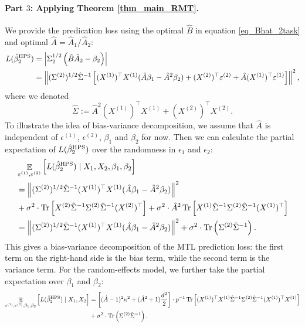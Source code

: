 \paragraph{Part $3$: Applying Theorem \ref{thm_main_RMT}.}
We provide the predication loss using the optimal $\hat B$ in equation \eqref{eq_Bhat_2task} and optimal $\hat A=\hat A_1/\hat A_2$:
\begin{align}
L(\hat{\beta}_2^{\textup{HPS}}) &=\left|\Sigma_2^{1/2} \left( \hat B \hat A_2 - \beta_2\right)\right| \nonumber\\
&=  \left\| (\Sigma^{(2)})^{1/2}\hat \Sigma^{-1} \left[(X^{(1)})^\top X^{(1)} (\hat A\beta_1-\hat A^2\beta_2)+ (X^{(2)})^\top \varepsilon^{(2)} + \hat A   (X^{(1)})^\top \varepsilon^{(1)} \right]\right\|^2,\label{Lbeta_HPS}
\end{align}
where we denoted
$$\hat \Sigma:= \hat A^2 (X^{(1)})^\top X^{(1)}  + (X^{(2)})^\top X^{(2)} .$$
To illustrate the idea of bias-variance decomposition, we assume that $\hat A$ is independent of $\epsilon^{(1)}$, $\epsilon^{(2)}$, $\beta_1$ and $\beta_2$ for now. Then we can calculate the partial expectation of $L(\hat{\beta}_2^{\textup{HPS}})$ over the randomness in $\epsilon_1$ and $\epsilon_2$:
 \begin{align}
	&\exarg{\epsilon^{(1)}, \epsilon^{(2)}}{L(\hat{\beta}_2^{\MTL}) \mid X_1, X_2,\beta_1,\beta_2} \nonumber \\
&	=  \bignorm{(\Sigma^{(2)})^{1/2}\hat\Sigma^{-1} (X^{(1)})^{\top}X^{(1)} (\hat A \beta_1 - \hat A^2\beta_2)}^2 \nonumber\\ %
			& + \sigma^2\cdot \bigtr{ X^{(2)} \hat\Sigma^{-1}\Sigma^{(2)}\hat\Sigma^{-1} (X^{(2)})^\top}+ \sigma^2\cdot \hat A^2 \bigtr{ X^{(1)} \hat\Sigma^{-1}\Sigma^{(2)}\hat\Sigma^{-1} (X^{(1)})^\top}\nonumber\\
			&= \bignorm{(\Sigma^{(2)})^{1/2}\hat\Sigma^{-1} (X^{(1)})^{\top}X^{(1)} (\hat A \beta_1 - \hat A^2\beta_2)}^2 +\sigma^2\cdot \tr\left(\Sigma^{(2)}\hat \Sigma^{-1}\right).\nonumber
\end{align}
This gives a bias-variance decomposition of the MTL prediction loss: the first term on the right-hand side is the bias term, while the second term is the variance term. For the random-effects model, we further take the partial expectation over $\beta_1$ and $\beta_2$: 
 \begin{align}
	\mathop{\mathbb{E}}_{\varepsilon^{(1)}, \varepsilon^{(2)},\beta_1,\beta_2}\left[ L(\hat{\beta}_2^{\textup{HPS}}) \mid X_1, X_2 \right]&	=  \left[(\hat A-1)^2 \kappa^2 + (\hat A^2+1)\frac{d^2}2\right] \cdot p^{-1}\operatorname{Tr}\left[ (X^{(1)})^{\top}X^{(1)} \hat\Sigma^{-1} \Sigma^{(2)} \hat\Sigma^{-1} (X^{(1)})^{\top}X^{(1)} \right]\nonumber \\
	&+\sigma^2\cdot \operatorname{Tr}\left(\Sigma^{(2)}\hat \Sigma^{-1}\right).
			\label{eq_var_2task}
\end{align}
